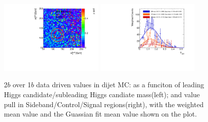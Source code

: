 \begin{figure}[htbp!]
\begin{center}
\includegraphics[width=0.45\textwidth,angle=-90]{figures/boosted/AppendixMuqcdstudy/QCD_TwoTag_Incl_mH0H1.pdf}
\includegraphics[width=0.45\textwidth,angle=-90]{figures/boosted/AppendixMuqcdstudy/QCD_TwoTag_Incl_mH0H1_pull.pdf}
\caption{2$b$ over 1$b$ data driven \muqcd values in dijet MC: \muqcd as a funciton of leading Higgs candidate/subleading Higgs candiate mass(left); and \muqcd value pull in Sideband/Control/Signal regions(right), with the weighted mean value and the Guassian fit mean value shown on the plot.}
\label{fig:app-muqcd-2b-qcd}
\end{center}
\end{figure}

